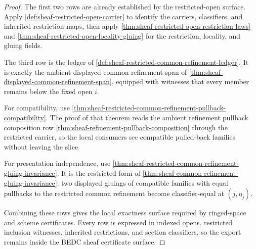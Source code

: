 \begin{proof}
The first two rows are already established by the restricted-open surface. Apply \autoref{def:sheaf-restricted-open-carrier} to identify the carriers, classifiers, and inherited restriction maps, then apply \autoref{thm:sheaf-restricted-open-restriction-laws} and \autoref{thm:sheaf-restricted-open-locality-gluing} for the restriction, locality, and gluing fields.

The third row is the ledger of \autoref{def:sheaf-restricted-common-refinement-ledger}. It is exactly the ambient displayed common-refinement span of \autoref{thm:sheaf-displayed-common-refinement-span}, equipped with witnesses that every member remains below the fixed open $i$.

For compatibility, use \autoref{thm:sheaf-restricted-common-refinement-pullback-compatibility}. The proof of that theorem reads the ambient refinement pullback composition row \autoref{thm:sheaf-refinement-pullback-composition} through the restricted carrier, so the local consumers see compatible pulled-back families without leaving the slice.

For presentation independence, use \autoref{thm:sheaf-restricted-common-refinement-gluing-invariance}. It is the restricted form of \autoref{thm:sheaf-common-refinement-gluing-invariance}: two displayed gluings of compatible families with equal pullbacks to the restricted common refinement become classifier-equal at $(j,\eta_j)$.

Combining these rows gives the local exactness surface required by ringed-space and scheme certificates. Every row is expressed in indexed opens, restricted inclusion witnesses, inherited restrictions, and section classifiers, so the export remains inside the BEDC sheaf certificate surface.
\end{proof}
